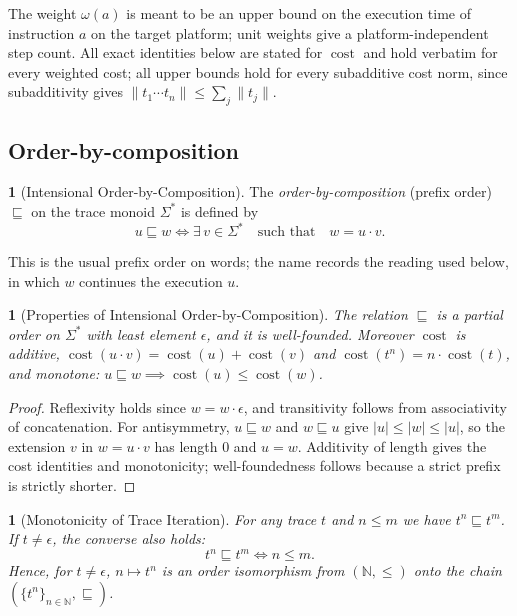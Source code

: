 \documentclass[oneside,english]{amsart}
\numberwithin{equation}{section}
\numberwithin{figure}{section}
\theoremstyle{plain}
\theoremstyle{definition}
\newtheorem{defn}[thm]{\protect\definitionname}
\theoremstyle{plain}
\newtheorem{prop}[thm]{\protect\propositionname}
\theoremstyle{remark}
\theoremstyle{plain}
\theoremstyle{definition}
\theoremstyle{plain}
\theoremstyle{remark}
\DeclareMathOperator{\cost}{cost}
\providecommand{\definitionname}{Definition}
\providecommand{\propositionname}{Proposition}
\begin{document}
The weight $\omega(a)$ is meant to be an upper bound on the execution time of instruction $a$ on the target platform; unit weights give a platform-independent step count. All exact identities below are stated for $\cost$ and hold verbatim for every weighted cost; all upper bounds hold for every subadditive cost norm, since subadditivity gives $\|t_1 \cdots t_n\| \le \sum_j \|t_j\|$.

\subsection{Order-by-composition}

\begin{defn}[Intensional Order-by-Composition]\label{def:order-by-composition}
The \textit{order-by-composition} (prefix order) $\sqsubseteq$ on the trace monoid $\Sigma^*$ is defined by
\[
u \sqsubseteq w \iff \exists\, v \in \Sigma^* \quad \text{such that} \quad w = u \cdot v.
\]
\end{defn}
This is the usual prefix order on words; the name records the reading used below, in which $w$ continues the execution $u$.

\begin{prop}[Properties of Intensional Order-by-Composition]
\label{prop:poset-properties}
The relation $\sqsubseteq$ is a partial order on $\Sigma^*$ with least element $\epsilon$, and it is well-founded. Moreover $\cost$ is additive, $\cost(u \cdot v) = \cost(u) + \cost(v)$ and $\cost(t^n) = n \cdot \cost(t)$, and monotone: $u \sqsubseteq w \implies \cost(u) \le \cost(w)$.
\end{prop}

\begin{proof}
Reflexivity holds since $w = w \cdot \epsilon$, and transitivity follows from associativity of concatenation. For antisymmetry, $u \sqsubseteq w$ and $w \sqsubseteq u$ give $|u| \le |w| \le |u|$, so the extension $v$ in $w = u \cdot v$ has length $0$ and $u = w$. Additivity of length gives the cost identities and monotonicity; well-foundedness follows because a strict prefix is strictly shorter.
\end{proof}

\begin{prop}[Monotonicity of Trace Iteration]
\label{prop:n-monotony}
For any trace $t$ and $n \le m$ we have $t^n \sqsubseteq t^m$. If $t \neq \epsilon$, the converse also holds:
\[
t^n \sqsubseteq t^m \iff n \le m.
\]
Hence, for $t \ne \epsilon$, $n \mapsto t^n$ is an order isomorphism from $(\mathbb{N}, \le)$ onto the chain $(\{t^n\}_{n \in \mathbb{N}}, \sqsubseteq)$.
\end{prop}
\end{document}
